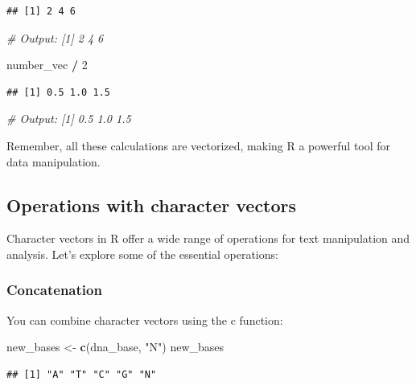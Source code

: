 \documentclass[
]{book}
\newenvironment{Shaded}{\begin{snugshade}}{\end{snugshade}}
\newcommand{\CommentTok}[1]{\textcolor[rgb]{0.56,0.35,0.01}{\textit{#1}}}
\newcommand{\DecValTok}[1]{\textcolor[rgb]{0.00,0.00,0.81}{#1}}
\newcommand{\FunctionTok}[1]{\textcolor[rgb]{0.13,0.29,0.53}{\textbf{#1}}}
\newcommand{\NormalTok}[1]{#1}
\newcommand{\OtherTok}[1]{\textcolor[rgb]{0.56,0.35,0.01}{#1}}
\newcommand{\SpecialCharTok}[1]{\textcolor[rgb]{0.81,0.36,0.00}{\textbf{#1}}}
\newcommand{\StringTok}[1]{\textcolor[rgb]{0.31,0.60,0.02}{#1}}
\begin{document}
\begin{verbatim}
## [1] 2 4 6
\end{verbatim}

\begin{Shaded}
\begin{Highlighting}[]
\CommentTok{\# Output: [1] 2 4 6}

\NormalTok{number\_vec }\SpecialCharTok{/} \DecValTok{2}
\end{Highlighting}
\end{Shaded}

\begin{verbatim}
## [1] 0.5 1.0 1.5
\end{verbatim}

\begin{Shaded}
\begin{Highlighting}[]
\CommentTok{\# Output: [1] 0.5 1.0 1.5}
\end{Highlighting}
\end{Shaded}

Remember, all these calculations are vectorized, making R a powerful tool for data manipulation.

\hypertarget{operations-with-character-vectors}{%
\subsection{Operations with character vectors}\label{operations-with-character-vectors}}

Character vectors in R offer a wide range of operations for text manipulation and analysis. Let's explore some of the essential operations:

\hypertarget{concatenation}{%
\subsubsection{Concatenation}\label{concatenation}}

You can combine character vectors using the c function:

\begin{Shaded}
\begin{Highlighting}[]
\NormalTok{new\_bases }\OtherTok{\textless{}{-}} \FunctionTok{c}\NormalTok{(dna\_base, }\StringTok{"N"}\NormalTok{)}
\NormalTok{new\_bases}
\end{Highlighting}
\end{Shaded}

\begin{verbatim}
## [1] "A" "T" "C" "G" "N"
\end{verbatim}
\end{document}
